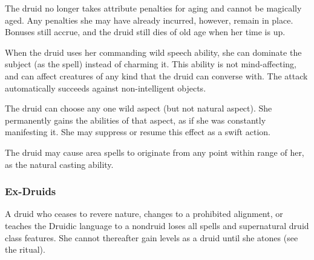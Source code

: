 The druid no longer takes attribute penalties for aging and cannot be magically aged.
Any penalties she may have already incurred, however, remain in place.
Bonuses still accrue, and the druid still dies of old age when her time is up.

 When the druid uses her commanding wild speech ability, she can dominate the subject (as the 
spell) instead of charming it.
This ability is not mind-affecting, and can affect creatures of any kind that the druid can converse with.
The attack automatically succeeds against non-intelligent objects.

The druid can choose any one wild aspect (but not natural aspect).
She permanently gains the abilities of that aspect, as if she was constantly manifesting it.
She may suppress or resume this effect as a swift action.

The druid may cause area spells to originate from any point within \rngmed range of her, as the natural casting ability.

\subsubsection{Ex-Druids}
A druid who ceases to revere nature, changes to a prohibited alignment, or teaches the Druidic language to a nondruid loses all spells and supernatural druid class features.
She cannot thereafter gain levels as a druid until she atones (see the  ritual).

